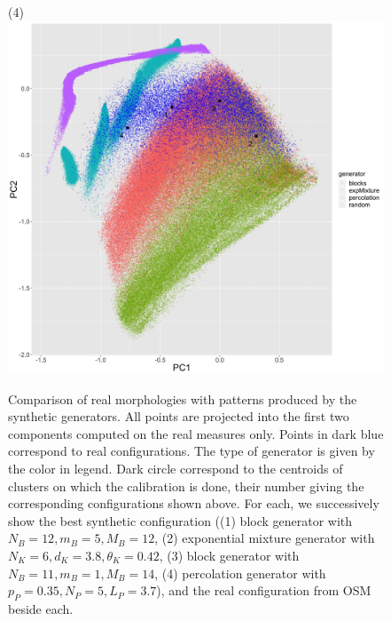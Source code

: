 \documentclass[letterpaper]{article}
\begin{document}
\begin{figure}
    (4)
    \\
    \includegraphics[width=\linewidth]{lhscalib_projrealpcs}
    \caption{Comparison of real morphologies with patterns produced by the synthetic generators. All points are projected into the first two components computed on the real measures only. Points in dark blue correspond to real configurations. The type of generator is given by the color in legend. Dark circle correspond to the centroids of clusters on which the calibration is done, their number giving the corresponding configurations shown above. For each, we successively show the best synthetic configuration ((1) block generator with $N_B=12,m_B=5,M_B=12$, (2) exponential mixture generator with $N_K=6,d_K=3.8,\theta_K=0.42$, (3) block generator with $N_B=11,m_B=1,M_B=14$, (4) percolation generator with $p_P=0.35,N_P=5,L_P=3.7$), and the real configuration from OSM beside each.}
    \label{fig:lhs}
\end{figure}
\end{document}
